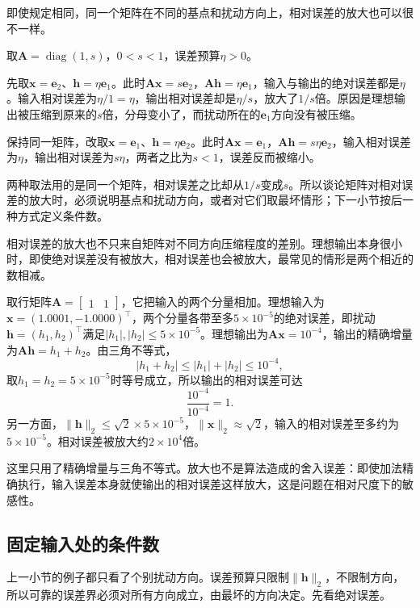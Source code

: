 即使规定相同，同一个矩阵在不同的基点和扰动方向上，相对误差的放大也可以很不一样。
\begin{example}[对角矩阵的两种基点]
\label{ex:ls-diagonal-relative-error-basepoints}
取$\bm A=\operatorname{diag}(1,s)$，$0<s<1$，误差预算$\eta>0$。

先取$\bm x=\bm e_2$、$\bm h=\eta\bm e_1$。此时$\bm A\bm x=s\bm e_2$，$\bm A\bm h=\eta\bm e_1$，输入与输出的绝对误差都是$\eta$。输入相对误差为$\eta/1=\eta$，输出相对误差却是$\eta/s$，放大了$1/s$倍。原因是理想输出被压缩到原来的$s$倍，分母变小了，而扰动所在的$\bm e_1$方向没有被压缩。

保持同一矩阵，改取$\bm x=\bm e_1$、$\bm h=\eta\bm e_2$。此时$\bm A\bm x=\bm e_1$，$\bm A\bm h=s\eta\bm e_2$，输入相对误差为$\eta$，输出相对误差为$s\eta$，两者之比为$s<1$，误差反而被缩小。
\end{example}
两种取法用的是同一个矩阵，相对误差之比却从$1/s$变成$s$。所以谈论矩阵对相对误差的放大时，必须说明基点和扰动方向，或者对它们取最坏情形；下一小节按后一种方式定义条件数。

相对误差的放大也不只来自矩阵对不同方向压缩程度的差别。理想输出本身很小时，即使绝对误差没有被放大，相对误差也会被放大，最常见的情形是两个相近的数相减。
\begin{example}[加法中的抵消]
\label{ex:ls-cancellation-relative-error}
取行矩阵$\bm A=\begin{bmatrix}1&1\end{bmatrix}$，它把输入的两个分量相加。理想输入为$\bm x=(1.0001,-1.0000)^\top$，两个分量各带至多$5\times10^{-5}$的绝对误差，即扰动$\bm h=(h_1,h_2)^\top$满足$|h_1|,|h_2|\leq5\times10^{-5}$。理想输出为$\bm A\bm x=10^{-4}$，输出的精确增量为$\bm A\bm h=h_1+h_2$。由三角不等式，
\[
 |h_1+h_2|\leq|h_1|+|h_2|\leq10^{-4},
\]
取$h_1=h_2=5\times10^{-5}$时等号成立，所以输出的相对误差可达
\[
 \frac{10^{-4}}{10^{-4}}=1 .
\]
另一方面，$\lVert\bm h\rVert_2\leq\sqrt2\times5\times10^{-5}$，$\lVert\bm x\rVert_2\approx\sqrt2$，输入的相对误差至多约为$5\times10^{-5}$。相对误差被放大约$2\times10^4$倍。
\end{example}
这里只用了精确增量与三角不等式。放大也不是算法造成的舍入误差：即使加法精确执行，输入误差本身就使输出的相对误差这样放大，这是问题在相对尺度下的敏感性。

\subsection{固定输入处的条件数}
\label{sec:ls-perturbation-conditioning}

上一小节的例子都只看了个别扰动方向。误差预算只限制$\lVert\bm h\rVert_2$，不限制方向，所以可靠的误差界必须对所有方向成立，由最坏的方向决定。先看绝对误差。

